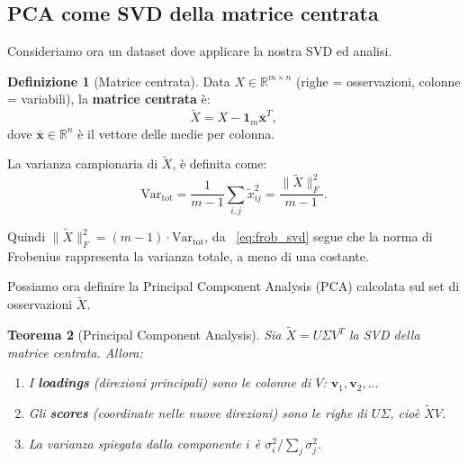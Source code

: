\documentclass[11pt,a4paper]{article}
\theoremstyle{plain}
\newtheorem{teorema}{Teorema}[section]
\theoremstyle{definition}
\newtheorem{definizione}[teorema]{Definizione}
\theoremstyle{remark}
\begin{document}
\subsection{PCA come SVD della matrice centrata}

Consideriamo ora un dataset dove applicare la nostra SVD ed analisi.

\begin{definizione}[Matrice centrata]
Data $X \in \mathbb{R}^{m \times n}$ (righe = osservazioni, colonne = variabili),
la \textbf{matrice centrata} è:
\[
  \tilde{X} = X - \mathbf{1}_m \bar{\mathbf{x}}^T,
\]
dove $\bar{\mathbf{x}} \in \mathbb{R}^n$ è il vettore delle medie per colonna.
\end{definizione}

La varianza campionaria di $\tilde{X}$, è definita come:
\begin{equation}
      \text{Var}_{\text{tot}} = \frac{1}{m-1} \sum_{i,j} \tilde{x}_{ij}^2
  = \frac{\|\tilde{X}\|_F^2}{m-1}. \label{eq:var1}
\end{equation}

Quindi $\|\tilde{X}\|_F^2 = (m{-}1) \cdot \text{Var}_{\text{tot}}$, da ~\eqref{eq:frob_svd} segue che la norma di
Frobenius rappresenta la varianza totale, a meno di una costante.

Possiamo ora definire la Principal Component Analysis (PCA) calcolata sul set di osservazioni  $\tilde{X}$.

\begin{teorema}[Principal Component Analysis]
\label{thm:pca}
Sia $\tilde{X} = U \Sigma V^T$ la SVD della matrice centrata. Allora:
\begin{enumerate}
  \item I \textbf{loadings} (direzioni principali) sono le colonne di $V$:
        $\mathbf{v}_1, \mathbf{v}_2, \ldots$
  \item Gli \textbf{scores} (coordinate nelle nuove direzioni) sono le righe
        di $U\Sigma$, cioè $\tilde{X} V$.
  \item La varianza spiegata dalla componente $i$ è
        $\sigma_i^2 / \sum_j \sigma_j^2$.
\end{enumerate}
\end{teorema}
\end{document}
